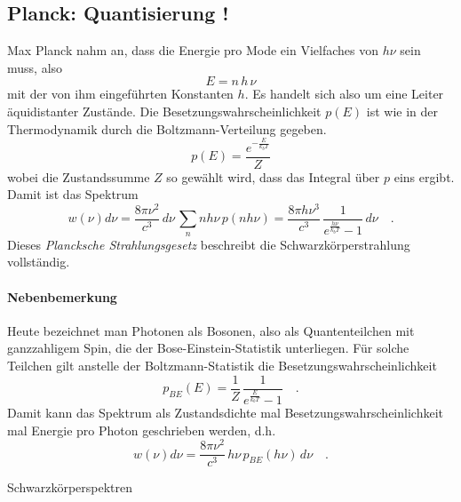 \subsection{Planck: Quantisierung !}

Max Planck nahm an, dass die Energie pro Mode ein Vielfaches von $h \nu$ sein muss, also 
\begin{equation}
    E = n \, h \, \nu
\end{equation}
mit der von ihm eingeführten Konstanten $h$. Es handelt sich also um eine Leiter äquidistanter Zustände. Die Besetzungswahrscheinlichkeit $p(E)$ ist wie in der Thermodynamik durch die Boltzmann-Verteilung gegeben.
\begin{equation}
    p(E) = \frac{e^{- \frac{E}{k_b T}}}{Z}
\end{equation}
wobei die Zustandssumme $Z$ so gewählt wird, dass das Integral über $p$ eins ergibt. Damit ist das Spektrum 
 \begin{equation}
     w(\nu) d\nu = \frac{8 \pi \nu^2}{c^3} \, d\nu \, \sum_n n h \nu \, p(n h \nu)
    = \frac{8 \pi h \nu^3}{c^3} \, \frac{1}{e^{\frac{h \nu}{k_b T}} -1} \,d\nu  \quad .
 \end{equation}
Dieses \emph{Plancksche Strahlungsgesetz} beschreibt die Schwarzkörperstrahlung vollständig.

\paragraph*{Nebenbemerkung} Heute bezeichnet man Photonen als Bosonen, also als Quantenteilchen mit ganzzahligem Spin, die der Bose-Einstein-Statistik unterliegen. Für solche Teilchen gilt anstelle der Boltzmann-Statistik die Besetzungswahrscheinlichkeit
\begin{equation}
   p_{BE}(E) = \frac{1}{Z} \, \frac{1}{e^{\frac{E}{k_b T}} -1}  \quad .
\end{equation}
Damit kann das Spektrum als Zustandsdichte mal Besetzungswahrscheinlichkeit mal Energie pro Photon geschrieben werden, d.h. 
\begin{equation}
   w(\nu) d\nu = \frac{8 \pi \nu^2}{c^3} \, h \nu \, p_{BE}(h\nu) \, d\nu   \quad .
\end{equation}


\begin{marginfigure}
    \caption{Schwarzkörperspektren}
\end{marginfigure}

